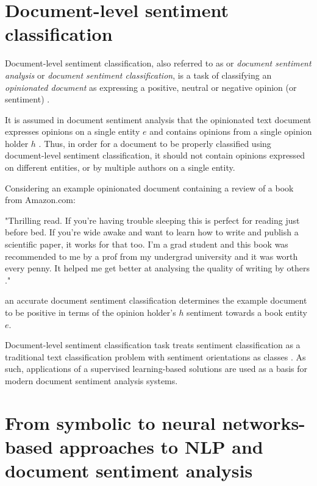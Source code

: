 \section{Document-level sentiment classification}
\label{document-level-sentiment-classification}

Document-level sentiment classification, also referred to as or \emph{document sentiment analysis} or \emph{document sentiment classification}, is a task of classifying an \emph{opinionated document} as expressing a positive, neutral or negative opinion (or sentiment) \cite{handbook_nlp}.

It is assumed in document sentiment analysis that the opinionated text document expresses opinions on a single entity $e$ and contains opinions from a single opinion holder $h$ \cite{liu}. Thus, in order for a document to be properly classified using document-level sentiment classification, it should not contain opinions expressed on different entities, or by multiple authors on a single entity.

Considering an example opinionated document containing a review of a book from Amazon.com:

\begin{remark}{}
\label{ex:1}
"Thrilling read. If you're having trouble sleeping this is perfect for reading just before bed. If you're wide awake and want to learn how to write and publish a scientific paper, it works for that too. I'm a grad student and this book was recommended to me by a prof from my undergrad university and it was worth every penny. It helped me get better at analysing the quality of writing by others \cite{amazon:review}."
\end{remark}

an accurate document sentiment classification determines the example document to be positive in terms of the opinion holder's $h$ sentiment towards a book entity $e$.

Document-level sentiment classification task treats sentiment classification as a traditional text classification problem with sentiment orientations as classes \cite{liu}. As such, applications of a supervised learning-based solutions are used as a basis for modern document sentiment analysis systems.

\section{From symbolic to neural networks-based approaches to NLP and document sentiment analysis}

